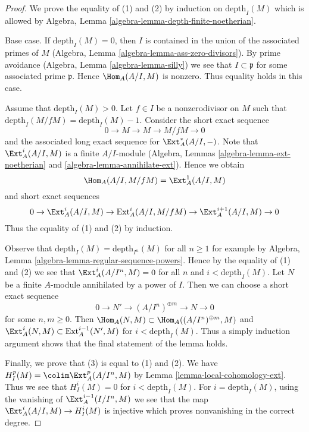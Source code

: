 \begin{proof}
We prove the equality of (1) and (2) by induction on $\text{depth}_I(M)$
which is allowed by
Algebra, Lemma \ref{algebra-lemma-depth-finite-noetherian}.

\medskip\noindent
Base case. If $\text{depth}_I(M) = 0$, then $I$ is contained in the union
of the associated primes of $M$
(Algebra, Lemma \ref{algebra-lemma-ass-zero-divisors}).
By prime avoidance (Algebra, Lemma \ref{algebra-lemma-silly})
we see that $I \subset \mathfrak p$ for some associated prime $\mathfrak p$.
Hence $\Hom_A(A/I, M)$
is nonzero. Thus equality holds in this case.

\medskip\noindent
Assume that $\text{depth}_I(M) > 0$. Let $f \in I$ be a nonzerodivisor
on $M$ such that $\text{depth}_I(M/fM) = \text{depth}_I(M) - 1$.
Consider the short exact sequence
$$
0 \to M \to M \to M/fM \to 0
$$
and the associated long exact sequence for $\Ext^*_A(A/I, -)$.
Note that $\Ext^i_A(A/I, M)$ is a finite $A/I$-module
(Algebra, Lemmas \ref{algebra-lemma-ext-noetherian} and
\ref{algebra-lemma-annihilate-ext}). Hence we obtain
$$
\Hom_A(A/I, M/fM) = \Ext^1_A(A/I, M)
$$
and short exact sequences
$$
0 \to \Ext^i_A(A/I, M) \to \text{Ext}^i_A(A/I, M/fM) \to
\Ext^{i + 1}_A(A/I, M) \to 0
$$
Thus the equality of (1) and (2) by induction.

\medskip\noindent
Observe that $\text{depth}_I(M) = \text{depth}_{I^n}(M)$ for all $n \geq 1$
for example by Algebra, Lemma \ref{algebra-lemma-regular-sequence-powers}.
Hence by the equality of (1) and (2) we see that
$\Ext^i_A(A/I^n, M) = 0$ for all $n$ and $i < \text{depth}_I(M)$.
Let $N$ be a finite $A$-module annihilated by a power of $I$.
Then we can choose a short exact sequence
$$
0 \to N' \to (A/I^n)^{\oplus m} \to N \to 0
$$
for some $n, m \geq 0$. Then
$\Hom_A(N, M) \subset \Hom_A((A/I^n)^{\oplus m}, M)$
and
$\Ext^i_A(N, M) \subset \text{Ext}^{i - 1}_A(N', M)$
for $i < \text{depth}_I(M)$. Thus a simply induction argument
shows that the final statement of the lemma holds.

\medskip\noindent
Finally, we prove that (3) is equal to (1) and (2).
We have $H^p_I(M) = \colim \Ext^p_A(A/I^n, M)$ by
Lemma \ref{lemma-local-cohomology-ext}.
Thus we see that $H^i_I(M) = 0$ for $i < \text{depth}_I(M)$.
For $i = \text{depth}_I(M)$, using the vanishing of
$\Ext_A^{i - 1}(I/I^n, M)$ we see that the map
$\Ext_A^i(A/I, M) \to H_I^i(M)$ is injective which
proves nonvanishing in the correct degree.
\end{proof}

